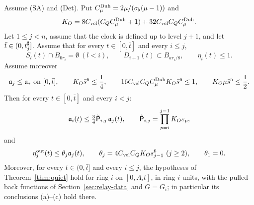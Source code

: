\begin{lemma}
\label{lem:O}
Assume (SA) and (Det). Put $C^{\mathrm{Duh}}_\mu=2\mu/(\sigma_\flat(\mu-1))$ and
\[
K_{O}=8C_{\mathrm{vel}} (C_QC^{\mathrm{Duh}}_\mu+1)+32C_{\mathrm{vel}} C_QC^{\mathrm{Duh}}_\mu .
\]
Let $1\le j<n$, assume that the clock is
defined up to level $j+1$, and let $\bar t\in(0,t^\sharp_j]$. Assume
that for every $t\in[0,\bar t]$ and every $i\le j$,
\begin{equation}
\label{eq:O-support}
S_l(t)\cap B_{6r_i}=\emptyset\ (l<i),\qquad
D_{i+1}(t)\subset B_{ar_i/8},\qquad \eta_i(t)\le1.
\end{equation}
Assume moreover
\begin{equation}
\label{eq:O-smallness}
\mathfrak{a}_j\le\mathfrak{a}_*\text{ on }[0,\bar t],\qquad
K_{O}\bar s^6\le\frac14,\qquad
16C_{\mathrm{vel}} C_QC^{\mathrm{Duh}}_\mu K_{O}\bar s^6\le1,\qquad K_{O}\mu\bar s^5\le\frac12.
\end{equation}
Then for every
$t\in[0,\bar t]$ and every $i<j$:
\begin{equation}
\label{eq:O-comparison}
\mathfrak{a}_i(t)\le\tfrac34\tilde{\mathsf{P}}_{i,j}\,\mathfrak{a}_j(t),\qquad \tilde{\mathsf{P}}_{i,j}=\prod_{p=i}^{j-1}K_{O}\varepsilon_p ,
\end{equation}
and
\begin{equation}
\label{eq:O-feedback}
\eta^{\mathrm{out}}_j(t)\le\theta_j\mathfrak{a}_j(t),\qquad
\theta_j=4C_{\mathrm{vel}} C_QK_{O} s_{j-1}^6\ (j\ge2),\qquad \theta_1=0.
\end{equation}
Moreover, for
every $t\in(0,\bar t]$ and every $i\le j$, the hypotheses of
Theorem~\ref{thm:quiet} hold for ring $i$ on $[0,A_it]$, in ring-$i$ units, with
the pulled-back functions of Section~\ref{sec:relay-data} and $G=G_i$; in particular its conclusions
\textup{(a)}--\textup{(c)} hold there.
\end{lemma}

